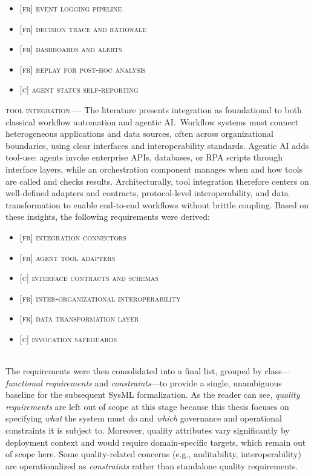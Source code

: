 \begin{itemize}
  \item \textsc{[fr] event logging pipeline}
  \item \textsc{[fr] decision trace and rationale}
  \item \textsc{[fr] dashboards and alerts}
  \item \textsc{[fr] replay for post-hoc analysis}
  \item \textsc{[c] agent status self-reporting}
\end{itemize}

\noindent \textsc{tool integration} --- The literature presents integration as foundational to both classical workflow automation and agentic AI.~Workflow systems must connect heterogeneous applications and data sources, often across organizational boundaries, using clear interfaces and interoperability standards. Agentic AI adds tool-use: agents invoke enterprise APIs, databases, or RPA scripts through interface layers, while an orchestration component manages when and how tools are called and checks results. Architecturally, tool integration therefore centers on well-defined adapters and contracts, protocol-level interoperability, and data transformation to enable end-to-end workflows without brittle coupling. Based on these insights, the following requirements were derived:

\begin{itemize}
  \item \textsc{[fr] integration connectors}
  \item \textsc{[fr] agent tool adapters}
  \item \textsc{[c] interface contracts and schemas}
  \item \textsc{[fr] inter-organizational interoperability}
  \item \textsc{[fr] data transformation layer}
  \item \textsc{[c] invocation safeguards}
\end{itemize} \\

The requirements were then consolidated into a final list, grouped by class---\emph{functional requirements} and \emph{constraints}—to provide a single, unambiguous baseline for the subsequent SysML formalization. As the reader can see, \emph{quality requirements} are left out of scope at this stage because this thesis focuses on specifying \emph{what} the system must do and \emph{which} governance and operational constraints it is subject to. Moreover, quality attributes vary significantly by deployment context and would require domain-specific targets, which remain out of scope here. Some quality-related concerns (e.g., auditability, interoperability) are operationalized as \emph{constraints} rather than standalone quality requirements. \\

